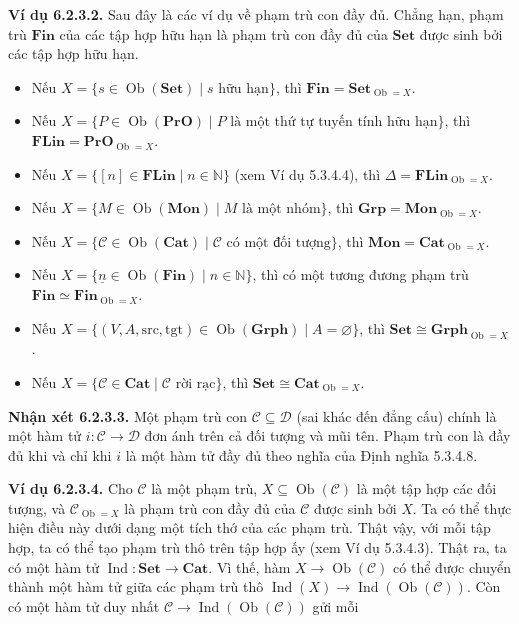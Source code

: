 \noindent\textbf{Ví dụ 6.2.3.2.} Sau đây là các ví dụ về phạm trù con đầy đủ. Chẳng hạn, phạm trù $\mathbf{Fin}$ của các tập hợp hữu hạn là phạm trù con đầy đủ của $\mathbf{Set}$ được sinh bởi các tập hợp hữu hạn.
\begin{itemize}
\item Nếu $X=\{s\in\operatorname{Ob}(\mathbf{Set})\mid s\text{ hữu hạn}\}$, thì $\mathbf{Fin}=\mathbf{Set}_{\operatorname{Ob}=X}$.
\item Nếu $X=\{P\in\operatorname{Ob}(\mathbf{PrO})\mid P\text{ là một thứ tự tuyến tính hữu hạn}\}$, thì $\mathbf{FLin}=\mathbf{PrO}_{\operatorname{Ob}=X}$.
\item Nếu $X=\{[n]\in\mathbf{FLin}\mid n\in\mathbb N\}$ (xem Ví dụ 5.3.4.4), thì $\Delta=\mathbf{FLin}_{\operatorname{Ob}=X}$.
\item Nếu $X=\{M\in\operatorname{Ob}(\mathbf{Mon})\mid M\text{ là một nhóm}\}$, thì $\mathbf{Grp}=\mathbf{Mon}_{\operatorname{Ob}=X}$.
\item Nếu $X=\{\mathcal C\in\operatorname{Ob}(\mathbf{Cat})\mid\mathcal C\text{ có một đối tượng}\}$, thì $\mathbf{Mon}=\mathbf{Cat}_{\operatorname{Ob}=X}$.
\item Nếu $X=\{\underline n\in\operatorname{Ob}(\mathbf{Fin})\mid n\in\mathbb N\}$, thì có một tương đương phạm trù $\mathbf{Fin}\simeq\mathbf{Fin}_{\operatorname{Ob}=X}$.
\item Nếu $X=\{(V,A,\mathrm{src},\mathrm{tgt})\in\operatorname{Ob}(\mathbf{Grph})\mid A=\varnothing\}$, thì $\mathbf{Set}\cong\mathbf{Grph}_{\operatorname{Ob}=X}$.
\item Nếu $X=\{\mathcal C\in\mathbf{Cat}\mid\mathcal C\text{ rời rạc}\}$, thì $\mathbf{Set}\cong\mathbf{Cat}_{\operatorname{Ob}=X}$.
\end{itemize}

\noindent\textbf{Nhận xét 6.2.3.3.} Một phạm trù con $\mathcal C\subseteq\mathcal D$ (sai khác đến đẳng cấu) chính là một hàm tử $i:\mathcal C\to\mathcal D$ đơn ánh trên cả đối tượng và mũi tên. Phạm trù con là đầy đủ khi và chỉ khi $i$ là một hàm tử đầy đủ theo nghĩa của Định nghĩa 5.3.4.8.

\noindent\textbf{Ví dụ 6.2.3.4.} Cho $\mathcal C$ là một phạm trù, $X\subseteq\operatorname{Ob}(\mathcal C)$ là một tập hợp các đối tượng, và $\mathcal C_{\operatorname{Ob}=X}$ là phạm trù con đầy đủ của $\mathcal C$ được sinh bởi $X$. Ta có thể thực hiện điều này dưới dạng một tích thớ của các phạm trù. Thật vậy, với mỗi tập hợp, ta có thể tạo phạm trù thô trên tập hợp ấy (xem Ví dụ 5.3.4.3). Thật ra, ta có một hàm tử $\operatorname{Ind}:\mathbf{Set}\to\mathbf{Cat}$. Vì thế, hàm $X\to\operatorname{Ob}(\mathcal C)$ có thể được chuyển thành một hàm tử giữa các phạm trù thô $\operatorname{Ind}(X)\to\operatorname{Ind}(\operatorname{Ob}(\mathcal C))$. Còn có một hàm tử duy nhất $\mathcal C\to\operatorname{Ind}(\operatorname{Ob}(\mathcal C))$ gửi mỗi
